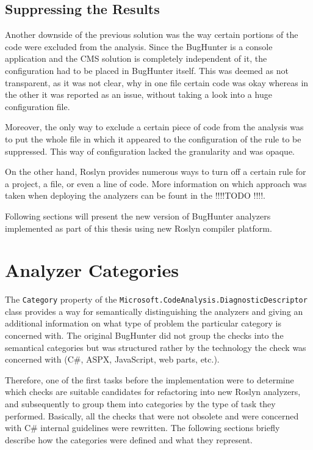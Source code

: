 \documentclass[
  digital, %
  table,   %
  lof,     %
  lot,     %
  oneside,
]{fithesis3}
\begin{document}
\subsection{Suppressing the Results}
Another downside of the previous solution was the way certain portions of the code were excluded from the analysis. Since the BugHunter is a console application and the CMS solution is completely independent of it, the configuration had to be placed in BugHunter itself. This was deemed as not transparent, as it was not clear, why in one file certain code was okay whereas in the other it was reported as an issue, without taking a look into a huge configuration file.

Moreover, the only way to exclude a certain piece of code from the analysis was to put the whole file in which it appeared to the configuration of the rule to be suppressed. This way of configuration lacked the granularity and was opaque. 

On the other hand, Roslyn provides numerous ways to turn off a certain rule for a project, a file, or even a line of code. More information on which approach was taken when deploying the analyzers can be fount in the !!!!TODO !!!!.

\bigskip\noindent
Following sections will present the new version of BugHunter analyzers implemented as part of this thesis using new Roslyn compiler platform.

\section{Analyzer Categories}
The \texttt{Category} property of the \texttt{Microsoft.CodeAnalysis.DiagnosticDescriptor} class provides a way for semantically distinguishing the analyzers and giving an additional information on what type of problem the particular category is concerned with. The original BugHunter did not group the checks into the semantical categories but was structured rather by the technology the check was concerned with (C\#, ASPX, JavaScript, web parts, etc.). 

Therefore, one of the first tasks before the implementation were to determine which checks are suitable candidates for refactoring into new Roslyn analyzers, and subsequently to group them into categories by the type of task they performed. Basically, all the checks that were not obsolete and were concerned with C\# internal guidelines were rewritten. The following sections briefly describe how the categories were defined and what they represent. 
\end{document}
